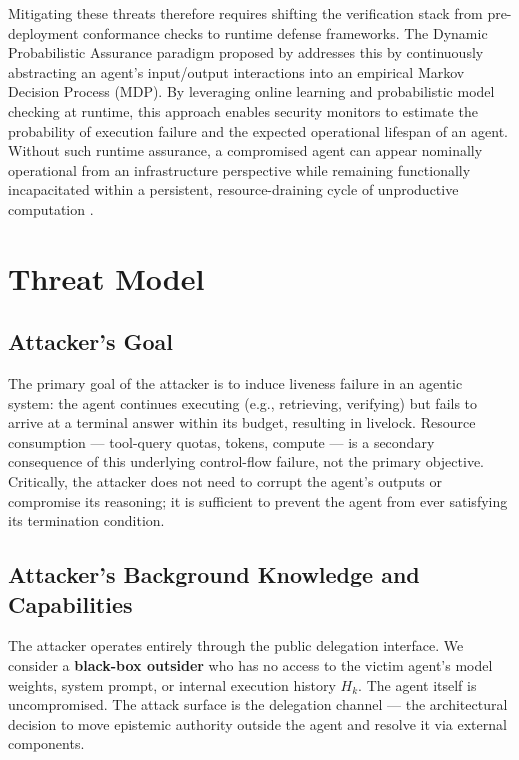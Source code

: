 \documentclass[conference]{IEEEtran}
\begin{document}
Mitigating these threats therefore requires shifting the verification stack from pre-deployment conformance checks to runtime defense frameworks. The Dynamic Probabilistic Assurance paradigm proposed by \cite{koohestani2025agentguard} addresses this by continuously abstracting an agent's input/output interactions into an empirical Markov Decision Process (MDP). By leveraging online learning and probabilistic model checking at runtime, this approach enables security monitors to estimate the probability of execution failure and the expected operational lifespan of an agent. Without such runtime assurance, a compromised agent can appear nominally operational from an infrastructure perspective while remaining functionally incapacitated within a persistent, resource-draining cycle of unproductive computation \cite{gao2024denial, shumailov2021sponge}.


\section{Threat Model}
\label{sec:threat-model}

\subsection{Attacker's Goal}

The primary goal of the attacker is to induce liveness failure in an agentic system: the agent continues executing (e.g., retrieving, verifying) but fails to arrive at a terminal answer within its budget, resulting in livelock. Resource consumption — tool-query quotas, tokens, compute — is a secondary consequence of this underlying control-flow failure, not the primary objective. Critically, the attacker does not need to corrupt the agent's outputs or compromise its reasoning; it is sufficient to prevent the agent from ever satisfying its termination condition.

\subsection{Attacker's Background Knowledge and Capabilities}

The attacker operates entirely through the public delegation interface. We consider a \textbf{black-box outsider} who has no access to the victim agent's model weights, system prompt, or internal execution history $H_k$. The agent itself is uncompromised. The attack surface is the delegation channel — the architectural decision to move epistemic authority outside the agent and resolve it via external components.
\end{document}
